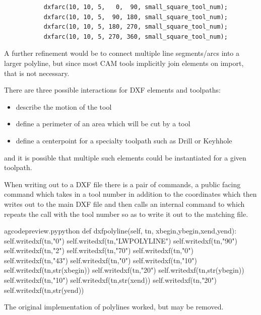 \documentclass{ltxdoc}
\begin{document}
\begin{verbatim}
           dxfarc(10, 10, 5,   0,  90, small_square_tool_num);
           dxfarc(10, 10, 5,  90, 180, small_square_tool_num);
           dxfarc(10, 10, 5, 180, 270, small_square_tool_num);
           dxfarc(10, 10, 5, 270, 360, small_square_tool_num);
\end{verbatim}
 
A further refinement would be to connect multiple line segments/arcs into a larger polyline, but since most CAM tools implicitly join elements on import, that is not necessary.
 
There are three possible interactions for DXF elements and toolpaths:

\begin{itemize}
 \item describe the motion of the tool
 \item define a perimeter of an area which will be cut by a tool
 \item define a centerpoint for a specialty toolpath such as Drill or Keyhhole
\end{itemize}
 
\noindent and it is possible that multiple such elements could be instantiated for a given toolpath.
 
When writing out to a DXF file there is a pair of commands, a public facing command which takes in a tool number in addition to the coordinates which then writes out to the main DXF file and then calls an internal command to which repeats the call with the tool number so as to write it out to the matching file.

\lstset{firstnumber=\thegcpy}
\begin{writecode}{a}{gcodepreview.py}{python}
    def dxfpolyline(self, tn, xbegin,ybegin,xend,yend):
        self.writedxf(tn,"0")
        self.writedxf(tn,"LWPOLYLINE")
        self.writedxf(tn,"90")
        self.writedxf(tn,"2")
        self.writedxf(tn,"70")
        self.writedxf(tn,"0")
        self.writedxf(tn,"43")
        self.writedxf(tn,"0")
        self.writedxf(tn,"10")
        self.writedxf(tn,str(xbegin))
        self.writedxf(tn,"20")
        self.writedxf(tn,str(ybegin))
        self.writedxf(tn,"10")
        self.writedxf(tn,str(xend))
        self.writedxf(tn,"20")
        self.writedxf(tn,str(yend))

\end{writecode}
\addtocounter{gcpy}{18}

The original implementation of polylines worked, but may be removed.
 
\end{document}
